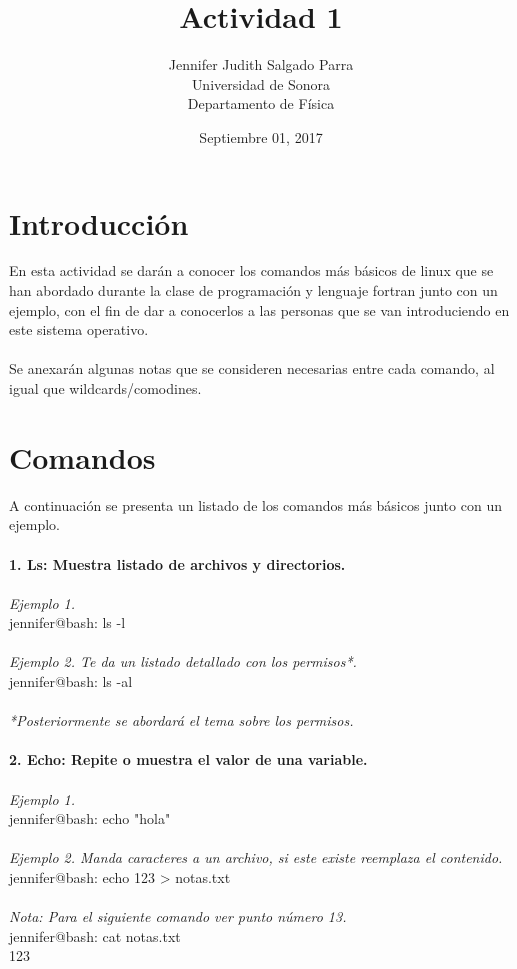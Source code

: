 \documentclass{article}
\title{Actividad 1}
\author{Jennifer Judith Salgado Parra \\ Universidad de Sonora\\ Departamento de Física \\}
\date {Septiembre 01, 2017}
\begin{document}
\maketitle
\section {Introducción} En esta actividad se darán a conocer los comandos más básicos de linux que se han abordado durante la clase de programación y lenguaje fortran junto con un ejemplo, con el fin de dar a conocerlos a las personas que se van introduciendo en este sistema operativo.
\\\\ Se anexarán algunas notas que se consideren necesarias entre cada comando, al igual que wildcards/comodines.

\section{Comandos} A continuación se presenta un listado de los comandos más básicos junto con un ejemplo.\\\\
\textbf{1. Ls: Muestra listado de archivos y directorios.}
\\\\\textit{Ejemplo 1.}
\\jennifer@bash: ls -l
\\\\\textit{Ejemplo 2. Te da un listado detallado con los permisos*.}
\\jennifer@bash: ls -al
\\\\\textit{*Posteriormente se abordará el tema sobre los permisos.} \\\\
\textbf{2. Echo: Repite o muestra el valor de una variable.}
\\\\\textit{Ejemplo 1.}
\\jennifer@bash: echo "hola"
\\\\\textit{Ejemplo 2. Manda caracteres a un archivo, si este existe reemplaza el contenido.}
\\jennifer@bash: echo 123 > notas.txt
\\\\\textit{Nota: Para el siguiente comando ver punto número 13.}
\\jennifer@bash: cat notas.txt
\\123\\\\
\end{document}
